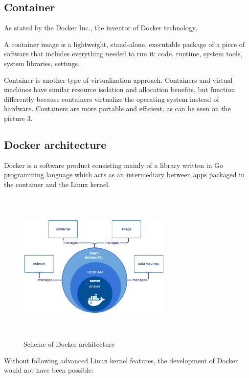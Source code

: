 \subsection{Container}

As stated by the Docker Inc., the inventor of Docker technology,

\begin{definition}
A container image is a lightweight, stand-alone,
executable package of a piece of software that includes everything
needed to run it: code, runtime,
system tools, system libraries, settings. \cite{DockerDefinition}
\end{definition}

Container is another type of virtualization approach.
Containers and virtual machines have
similar resource isolation and allocation benefits,
but function differently because containers
virtualize the operating system instead of hardware.
Containers are more portable and efficient,
as can be seen on the picture 3.

\subsection{Docker architecture}

Docker is a software product consisting mainly of a
library written in Go programming language
which acts as an intermediary between apps packaged
in the container and the Linux kernel.

\begin{figure}
\includegraphics[height=3in, width=3in]{dockerarch}
\caption{Scheme of Docker architecture}
\end{figure}

Without following advanced Linux kernel features,
the development of Docker would not have been possible:

